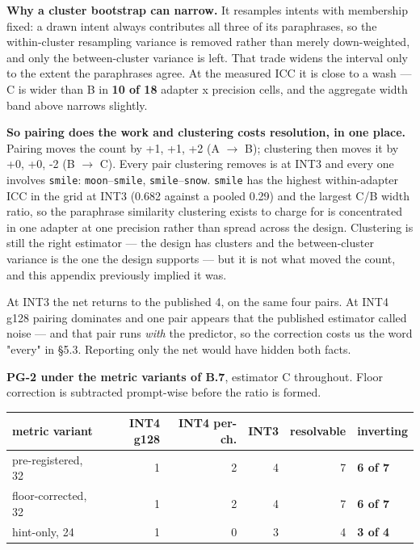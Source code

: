 \textbf{Why a cluster bootstrap can narrow.} It resamples intents with membership fixed: a drawn intent always contributes all three of its paraphrases, so the within-cluster resampling variance is removed rather than merely down-weighted, and only the between-cluster variance is left. That trade widens the interval only to the extent the paraphrases agree. At the measured ICC it is close to a wash --- C is wider than B in \textbf{10 of 18} adapter x precision cells, and the aggregate width band above narrows slightly.

\textbf{So pairing does the work and clustering costs resolution, in one place.} Pairing moves the count by +1, +1, +2 (A $\rightarrow$ B); clustering then moves it by +0, +0, -2 (B $\rightarrow$ C). Every pair clustering removes is at INT3 and every one involves \texttt{smile}: \texttt{moon}--\texttt{smile}, \texttt{smile}--\texttt{snow}. \texttt{smile} has the highest within-adapter ICC in the grid at INT3 (0.682 against a pooled 0.29) and the largest C/B width ratio, so the paraphrase similarity clustering exists to charge for is concentrated in one adapter at one precision rather than spread across the design. Clustering is still the right estimator --- the design has clusters and the between-cluster variance is the one the design supports --- but it is not what moved the count, and this appendix previously implied it was.

At INT3 the net returns to the published 4, on the same four pairs. At INT4 g128 pairing dominates and one pair appears that the published estimator called noise --- and that pair runs \emph{with} the predictor, so the correction costs us the word "every" in \S{}5.3. Reporting only the net would have hidden both facts.

\textbf{PG-2 under the metric variants of B.7}, estimator C throughout. Floor correction is subtracted prompt-wise before the ratio is formed.

\begin{table}[t]
\centering\footnotesize
\begin{tabularx}{\textwidth}{>{\hsize=1.000\hsize\raggedright\arraybackslash}Xrrrrl}
\toprule
metric variant & INT4 g128 & INT4 per-ch. & INT3 & resolvable & inverting \\
\midrule
pre-registered, 32 & 1 & 2 & 4 & 7 & \textbf{6 of 7} \\
floor-corrected, 32 & 1 & 2 & 4 & 7 & \textbf{6 of 7} \\
hint-only, 24 & 1 & 0 & 3 & 4 & \textbf{3 of 4} \\
\bottomrule
\end{tabularx}
\end{table}

